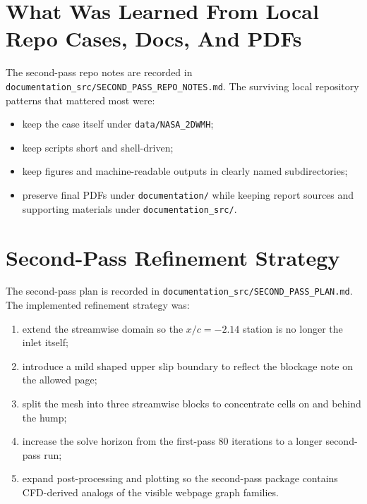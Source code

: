 \documentclass[11pt]{article}
\begin{document}
\section{What Was Learned From Local Repo Cases, Docs, And PDFs}
The second-pass repo notes are recorded in \texttt{documentation\_src/SECOND\_PASS\_REPO\_NOTES.md}. The surviving local repository patterns that mattered most were:
\begin{itemize}
\item keep the case itself under \texttt{data/NASA\_2DWMH};
\item keep scripts short and shell-driven;
\item keep figures and machine-readable outputs in clearly named subdirectories;
\item preserve final PDFs under \texttt{documentation/} while keeping report sources and supporting materials under \texttt{documentation\_src/}.
\end{itemize}

\section{Second-Pass Refinement Strategy}
The second-pass plan is recorded in \texttt{documentation\_src/SECOND\_PASS\_PLAN.md}. The implemented refinement strategy was:
\begin{enumerate}
\item extend the streamwise domain so the \(x/c=-2.14\) station is no longer the inlet itself;
\item introduce a mild shaped upper slip boundary to reflect the blockage note on the allowed page;
\item split the mesh into three streamwise blocks to concentrate cells on and behind the hump;
\item increase the solve horizon from the first-pass 80 iterations to a longer second-pass run;
\item expand post-processing and plotting so the second-pass package contains CFD-derived analogs of the visible webpage graph families.
\end{enumerate}
\end{document}
